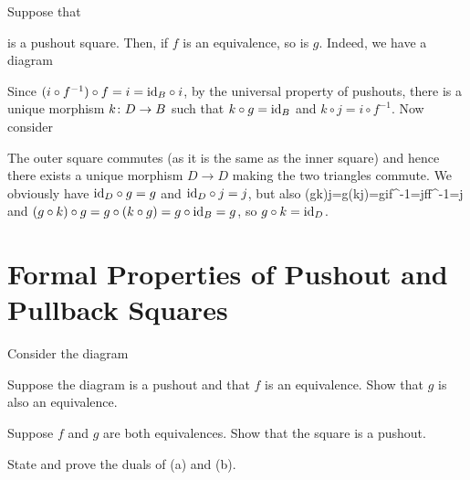 \bs
Suppose that
\bse
{}
\ese
is a pushout square. Then, if $f$ is an equivalence, so is $g$. Indeed, we have a diagram
\bse
{}
\ese
Since $(i\circ f^{-1})\circ f=i=\mathrm{id}_B\circ i$, by the universal property of pushouts, there is a unique morphism $k\colon D\to B$ such that $k\circ g=\mathrm{id}_B$ and $k\circ j=i\circ f^{-1}$. Now consider
\bse
{}
\ese
The outer square commutes (as it is the same as the inner square) and hence there exists a unique morphism $D\to D$ making the two triangles commute. We obviously have $\mathrm{id}_D\circ g= g$ and $\mathrm{id}_D\circ j= j$, but also
\bse
(g\circ k)\circ j=g\circ (k\circ j)=g\circ i\circ f^{-1}=j\circ f\circ f^{-1}=j
\ese
and $(g\circ k)\circ g=g\circ(k\circ g)=g\circ \mathrm{id}_B=g$, so $g\circ k=\mathrm{id}_D$.  

\es

\section{Formal Properties of Pushout and Pullback Squares}

\bp
Consider the diagram
\bse
{}
\ese
\ben[label=(\alph*)]
\item Suppose the diagram is a pushout and that $f$ is an equivalence. Show that $g$ is also an equivalence.
\item Suppose $f$ and $g$ are both equivalences. Show that the square is a pushout.
\item State and prove the duals of (a) and (b).
\een
\ep

